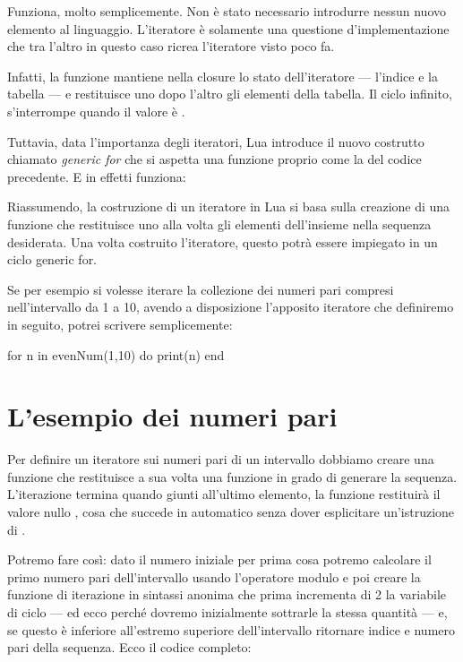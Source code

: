 Funziona, molto semplicemente. Non è stato necessario introdurre nessun nuovo
elemento al linguaggio. L'iteratore è solamente una questione d'implementazione
che tra l'altro in questo caso ricrea l'iteratore  visto poco fa.

Infatti, la funzione  mantiene nella closure lo stato
dell'iteratore --- l'indice  e la tabella  --- e restituisce uno
dopo l'altro gli elementi della tabella. Il ciclo 
infinito, s'interrompe quando il valore è .

Tuttavia, data l'importanza degli iteratori, Lua introduce il nuovo costrutto
chiamato \emph{generic for} che si aspetta una funzione proprio come la
 del codice precedente. E in effetti funziona:

Riassumendo, la costruzione di un iteratore in Lua si basa sulla creazione di
una funzione che restituisce uno alla volta gli elementi dell'insieme nella
sequenza desiderata. Una volta costruito l'iteratore, questo potrà essere
impiegato in un ciclo generic for.

Se per esempio si volesse iterare la collezione dei numeri pari compresi
nell'intervallo da 1 a 10, avendo a disposizione l'apposito iteratore
 che definiremo in seguito, potrei scrivere semplicemente:
\begin{lines}
for n in evenNum(1,10) do
    print(n)
end
\end{lines}


\section{L'esempio dei numeri pari}

Per definire un iteratore sui numeri pari di un intervallo dobbiamo creare una
funzione che restituisce a sua volta una funzione in grado di generare la
sequenza. L'iterazione termina quando giunti all'ultimo elemento, la funzione
restituirà il valore nullo , cosa che succede in automatico senza dover
esplicitare un'istruzione di .

Potremo fare così: dato il numero iniziale per prima cosa potremo calcolare il
primo numero pari dell'intervallo usando l'operatore modulo \key{\%}\luas{\%} e
poi creare la funzione di iterazione in sintassi anonima che prima incrementa di
2 la variabile di ciclo --- ed ecco perché dovremo inizialmente sottrarle la
stessa quantità --- e, se questo è inferiore all'estremo superiore
dell'intervallo ritornare indice e numero pari della sequenza. Ecco il codice
completo:


